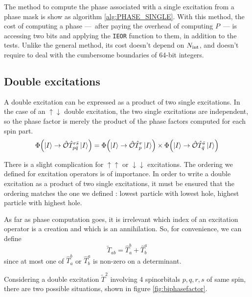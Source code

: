 \documentclass[./thesis.tex]{subfiles}
\begin{document}
The method to compute the phase associated with a single excitation from a phase mask is show as algorithm \ref{alg:PHASE_SINGLE}.
With this method, the cost of computing a phase ---~after paying the overhead of computing $P$~--- is accessing two bits and applying the \lstinline{IEOR} function to them, in addition to the tests. Unlike the general method, its cost doesn't depend on ${N_\text{int}}$, and doesn't require to deal with the cumbersome boundaries of 64-bit integers.\phantom{\ref{alg:EXC_DEGREE}}


\subsection{Double excitations}


A double excitation can be expressed as a product of two single excitations.
In the case of an $\uparrow \downarrow$ double excitation, the two single excitations are independent, so the phase factor is merely the product of the phase factors computed for each spin part. 
\begin{equation}
{\Phi \qty(\ket{I} \rightarrow {\hat{\mathcal{O}}}{\hat{T}_{p \bar q}^{r \bar s}} \ket{I})} = 
{\Phi \qty(\ket{I} \rightarrow {\hat{\mathcal{O}}} {\hat{T}_{p}^{r}} \ket{I})} \times
{\Phi \qty(\ket{I} \rightarrow {\hat{\mathcal{O}}}{\hat{T}_{\bar q}^{\bar s}} \ket{I})} 
\end{equation}


There is a slight complication for $\uparrow \uparrow$ or $\downarrow \downarrow$ excitations. The ordering we defined for excitation operators is of importance. In order to write a double excitation as a product of two single excitations, it must be ensured that the ordering matches the one we defined : lowest particle with lowest hole, highest particle with highest hole.

As far as phase computation goes, it is irrelevant which index of an excitation operator is a creation and which is an annihilation. So, for convenience, we can define
\begin{equation}
\tilde T_{ab} = \hat T_a^b + \hat T_b^a
\end{equation}
since at most one of $\hat T_a^b$ or $\hat T_b^a$ is non-zero on a determinant.


Considering a double excitation $\tilde T^2$ involving 4 spinorbitals $p,q,r,s$ of same spin, there are two possible situations, shown in figure \ref{fig:biphasefactor}. 
\end{document}
